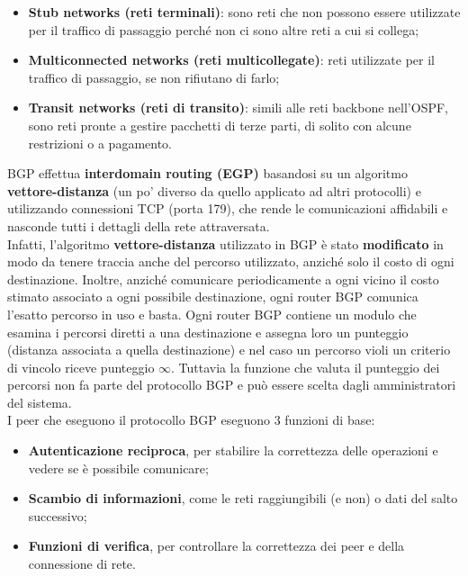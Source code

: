 \documentclass{article}
\begin{document}
            \begin{itemize}
                \item \textbf{Stub networks (reti terminali)}: sono reti che non possono essere utilizzate per il
                traffico di passaggio perché non ci sono altre reti a cui si collega;
                \item \textbf{Multiconnected networks (reti multicollegate)}: reti utilizzate per il traffico di
                passaggio, se non rifiutano di farlo;
                \item \textbf{Transit networks (reti di transito)}: simili alle reti backbone nell’OSPF, sono reti
                pronte a gestire pacchetti di terze parti, di solito con alcune restrizioni o a pagamento.
            \end{itemize}


        BGP effettua \textbf{interdomain routing (EGP)} basandosi su un algoritmo \textbf{vettore-distanza} (un po’
        diverso da quello applicato ad altri protocolli) e utilizzando connessioni TCP (porta 179), che
        rende le comunicazioni affidabili e nasconde tutti i dettagli della rete attraversata.\\
        

        Infatti, l’algoritmo \textbf{vettore-distanza} utilizzato in BGP è stato \textbf{modificato} in modo da tenere
        traccia anche del percorso utilizzato, anziché solo il costo di ogni destinazione. Inoltre, anziché
        comunicare periodicamente a ogni vicino il costo stimato associato a ogni possibile
        destinazione, ogni router BGP comunica l’esatto percorso in uso e basta. Ogni router BGP
        contiene un modulo che esamina i percorsi diretti a una destinazione e assegna loro un
        punteggio (distanza associata a quella destinazione) e nel caso un percorso violi un criterio di
        vincolo riceve punteggio $\infty$. Tuttavia la funzione che valuta il punteggio dei percorsi non fa
        parte del protocollo BGP e può essere scelta dagli amministratori del sistema.\\

        I peer che eseguono il protocollo BGP eseguono 3 funzioni di base:

            \begin{itemize}
                \item \textbf{Autenticazione reciproca}, per stabilire la correttezza delle operazioni e vedere se è
                possibile comunicare;
                \item \textbf{Scambio di informazioni}, come le reti raggiungibili (e non) o dati del salto successivo;
                \item \textbf{Funzioni di verifica}, per controllare la correttezza dei peer e della connessione di rete.
            \end{itemize}
\end{document}
